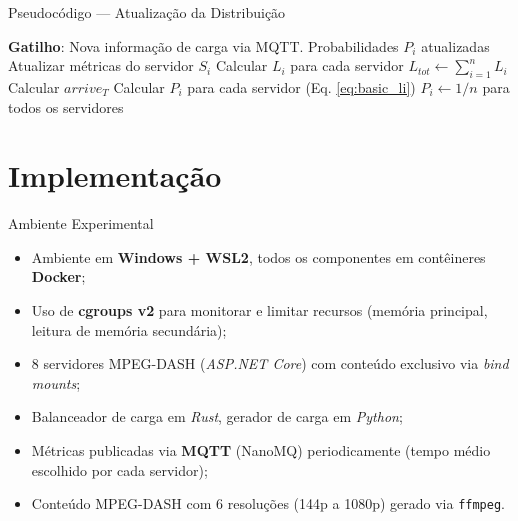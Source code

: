 \documentclass[10pt]{beamer}
\begin{document}
\begin{frame}{Pseudocódigo — Atualização da Distribuição}
    \vspace{-0.5cm}
    \tiny
    \begin{algorithm}[H]
    \caption*{\textbf{Algoritmo} Atualização da distribuição de probabilidade}
    \begin{algorithmic}[1]
    \Statex \textbf{Gatilho}: Nova informação de carga via MQTT.
    \Ensure Probabilidades $P_i$ atualizadas
        \State Atualizar métricas do servidor $S_i$
        \State Calcular $L_i$ para cada servidor
        \State $L_{tot} \leftarrow \sum_{i=1}^{n} L_i$
        \State Calcular $arrive_T$
        \State Calcular $P_i$ para cada servidor (Eq. \ref{eq:basic_li})
            \State $P_i \leftarrow 1/n$ para todos os servidores
        \EndIf
    \EndProcedure
    \end{algorithmic}
    \end{algorithm}
\end{frame}


\section{Implementação}

\begin{frame}{Ambiente Experimental}
    \begin{itemize}
        \item Ambiente em \textbf{Windows + WSL2}, todos os componentes em contêineres \textbf{Docker};
        \item Uso de \textbf{cgroups v2} para monitorar e limitar recursos (memória principal, leitura de memória secundária);
        \item 8 servidores MPEG-DASH (\textit{ASP.NET Core}) com conteúdo exclusivo via \textit{bind mounts};
        \item Balanceador de carga em \textit{Rust}, gerador de carga em \textit{Python};
        \item Métricas publicadas via \textbf{MQTT} (NanoMQ) periodicamente (tempo médio escolhido por cada servidor);
        \item Conteúdo MPEG-DASH com 6 resoluções (144p a 1080p) gerado via \texttt{ffmpeg}.
    \end{itemize}
\end{frame}
\end{document}
